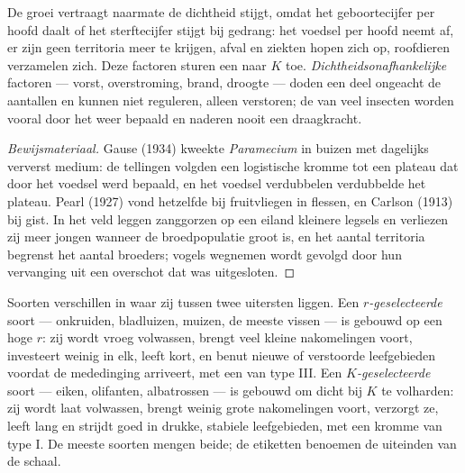 \begin{proposition}[Dichtheidsafhankelijkheid]\label{prop:b1:populations:densitydependence}
De groei vertraagt naarmate de dichtheid stijgt, omdat het geboortecijfer
per hoofd daalt of het sterftecijfer stijgt bij gedrang: het voedsel per
hoofd neemt af, er zijn geen territoria meer te krijgen, afval en ziekten
hopen zich op, roofdieren verzamelen zich. Deze
\emph{} factoren sturen een  naar $K$ toe.
\emph{Dichtheidsonafhankelijke} factoren --- vorst, overstroming, brand,
droogte --- doden een deel ongeacht de aantallen en kunnen niet reguleren,
alleen verstoren; de  van veel insecten worden vooral door het
weer bepaald en naderen nooit een draagkracht.
\end{proposition}
\begin{proof}[Bewijsmateriaal]
Gause (1934) kweekte \emph{Paramecium} in buizen met dagelijks ververst
medium: de tellingen volgden een logistische kromme tot een plateau dat door
het voedsel werd bepaald, en het voedsel verdubbelen verdubbelde het
plateau. Pearl (1927) vond hetzelfde bij fruitvliegen in flessen, en Carlson
(1913) bij gist. In het veld leggen zanggorzen op een eiland kleinere
legsels en verliezen zij meer jongen wanneer de broedpopulatie groot is, en
het aantal territoria begrenst het aantal broeders; vogels wegnemen wordt
gevolgd door hun vervanging uit een overschot dat was uitgesloten.
\end{proof}

\begin{definition}\label{def:b1:populations:rK}
Soorten verschillen in waar zij tussen twee uitersten liggen. Een
\emph{$r$-geselecteerde} soort --- onkruiden, bladluizen, muizen, de meeste
vissen --- is gebouwd op een hoge $r$: zij wordt vroeg volwassen, brengt
veel kleine nakomelingen voort, investeert weinig in elk, leeft kort, en
benut nieuwe of verstoorde leefgebieden voordat de mededinging arriveert,
met een  van type III. Een \emph{$K$-geselecteerde} soort ---
eiken, olifanten, albatrossen --- is gebouwd om dicht bij $K$ te volharden:
zij wordt laat volwassen, brengt weinig grote nakomelingen voort, verzorgt
ze, leeft lang en strijdt goed in drukke, stabiele leefgebieden, met een
kromme van type I. De meeste soorten mengen beide; de etiketten benoemen de
uiteinden van de schaal.
\end{definition}


